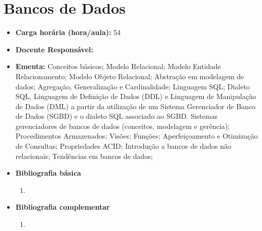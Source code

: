 \documentclass[11pt,fleqn]{book} %
\begin{document}

\newpage
\section{Bancos de Dados}\label{disc:bancodados}

\begin{itemize}
	\item \textbf{Carga horária (hora/aula):} 54
	\item \textbf{Docente Responsável:}~
	\item \textbf{Ementa:} 
	Conceitos básicos; 
	Modelo Relacional; 
	Modelo Entidade Relacionamento; 
	Modelo Objeto Relacional;
	Abstração em modelagem de dados; 
	Agregação, Generalização e Cardinalidade; 
	Linguagem SQL; 
	Dialeto SQL, Linguagem de Definição de Dados (DDL) e Linguagem de Manipulação de Dados (DML) a partir da utilização de um Sistema Gerenciador de Banco de Dados (SGBD) e o dialeto SQL associado ao SGBD.
	Sistemas gerenciadores de bancos de dados (conceitos, modelagem e gerência);
	Procedimentos Armazenados; 
	Visões; 
	Funções; 
	Aperfeiçoamento e Otimização de Consultas;
	Propriedades ACID;
	Introdução a bancos de dados não relacionais;
	Tendências em bancos de dados;
	\item \textbf{Bibliografia básica}
	\begin{enumerate}
		\item 
	\end{enumerate}
	\item \textbf{Bibliografia complementar}
	\begin{enumerate}
		\item 
	\end{enumerate}	
\end{itemize}


\newpage
\end{document}
